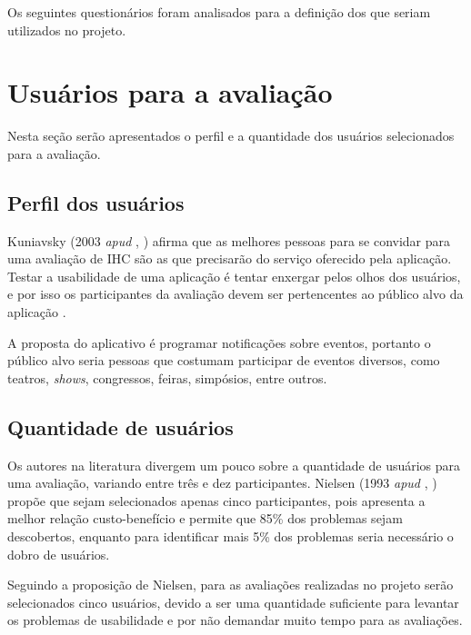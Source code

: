     Os seguintes questionários foram analisados para a definição dos que seriam utilizados no projeto.
    
    
    
  \section{Usuários para a avaliação}
      
    Nesta seção serão apresentados o perfil e a quantidade dos usuários selecionados para a avaliação.
    
    \subsection{Perfil dos usuários}
      
      Kuniavsky (2003 \textit{apud} \citeauthor{barbosa10}, \citeyear{barbosa10}) afirma que as melhores pessoas para
      se convidar para uma avaliação de IHC são as que precisarão do serviço oferecido pela aplicação.
      Testar a usabilidade de uma aplicação é tentar enxergar pelos olhos dos usuários, e por isso os participantes da avaliação 
      devem ser pertencentes ao público alvo da aplicação \cite{barbosa10}.
      
      A proposta do aplicativo é programar notificações sobre eventos, portanto o público alvo seria pessoas que costumam 
      participar de eventos diversos, como teatros, \textit{shows}, congressos, feiras, simpósios, entre outros.
      
    \subsection{Quantidade de usuários}
      
      Os autores na literatura divergem um pouco sobre a quantidade de usuários para uma avaliação, variando entre três e dez participantes.
      Nielsen (1993 \textit{apud} \citeauthor{barbosa10}, \citeyear{barbosa10}) propõe que sejam selecionados apenas cinco participantes,
      pois apresenta a melhor relação custo-benefício e permite que 85\% dos problemas sejam descobertos, enquanto para identificar mais
      5\% dos problemas seria necessário o dobro de usuários. 
      
      Seguindo a proposição de Nielsen, para as avaliações realizadas no projeto serão selecionados cinco usuários, devido a ser uma 
      quantidade suficiente para levantar os problemas de usabilidade e por não demandar muito tempo para as avaliações.
    
